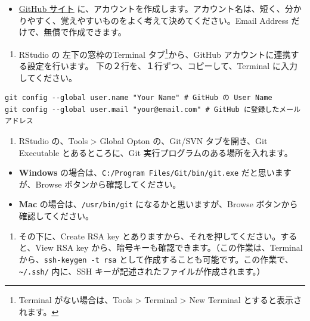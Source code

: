 \documentclass[
]{bxjsbook}
\providecommand{\tightlist}{%
  \setlength{\itemsep}{0pt}\setlength{\parskip}{0pt}}
\theoremstyle{definition}
\theoremstyle{definition}
\theoremstyle{definition}
\theoremstyle{definition}
\theoremstyle{remark}
\begin{document}
\begin{itemize}
\tightlist
\item
  \href{https://github.com}{GitHub サイト} に、アカウントを作成します。アカウント名は、短く、分かりやすく、覚えやすいものをよく考えて決めてください。Email Address だけで、無償で作成できます。
\end{itemize}

\begin{enumerate}
\def\labelenumi{\arabic{enumi}.}
\setcounter{enumi}{2}
\tightlist
\item
  RStudio の 左下の窓枠のTerminal タブ\footnote{Terminal がない場合は、Tools \textgreater{} Terminal \textgreater{} New Terminal とすると表示されます。}から、GitHub アカウントに連携する設定を行います。
  下の２行を、１行ずつ、コピーして、Terminal に入力してください。
\end{enumerate}

\begin{verbatim}
git config --global user.name "Your Name" # GitHub の User Name
git config --global user.mail "your@email.com" # GitHub に登録したメールアドレス
\end{verbatim}

\begin{enumerate}
\def\labelenumi{\arabic{enumi}.}
\setcounter{enumi}{3}
\tightlist
\item
  RStudio の、Tools \textgreater{} Global Opton の、Git/SVN タブを開き、Git Executable とあるところに、Git 実行プログラムのある場所を入れます。
\end{enumerate}

\begin{itemize}
\tightlist
\item
  \textbf{Windows} の場合は、\texttt{C:/Program\ Files/Git/bin/git.exe} だと思いますが、Browse ボタンから確認してください。
\item
  \textbf{Mac} の場合は、\texttt{/usr/bin/git} になるかと思いますが、Browse ボタンから確認してください。
\end{itemize}

\begin{enumerate}
\def\labelenumi{\arabic{enumi}.}
\setcounter{enumi}{4}
\tightlist
\item
  その下に、Create RSA key とありますから、それを押してください。すると、View RSA key から、暗号キーも確認できます。（この作業は、Terminal から、\texttt{ssh-keygen\ -t\ rsa} として作成することも可能です。この作業で、\texttt{\textasciitilde{}/.ssh/} 内に、SSH キーが記述されたファイルが作成されます。）
\end{enumerate}
\end{document}
